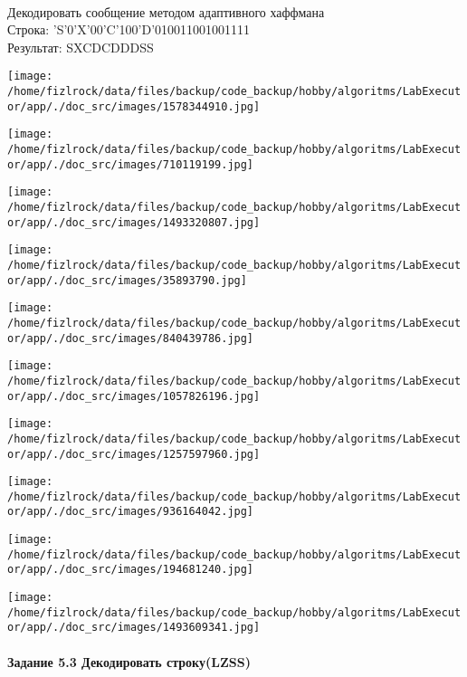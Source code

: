 \documentclass[a4paper, 12pt]{article}
\begin{document}
\\ 

Декодировать сообщение методом адаптивного хаффмана \\
Строка: 
'S'0'X'00'C'100'D'010011001001111\\
Результат: SXCDCDDDSS

\texttt{[image: /home/fizlrock/data/files/backup/code\_backup/hobby/algoritms/LabExecutor/app/./doc\_src/images/1578344910.jpg]}

\texttt{[image: /home/fizlrock/data/files/backup/code\_backup/hobby/algoritms/LabExecutor/app/./doc\_src/images/710119199.jpg]}

\texttt{[image: /home/fizlrock/data/files/backup/code\_backup/hobby/algoritms/LabExecutor/app/./doc\_src/images/1493320807.jpg]}

\texttt{[image: /home/fizlrock/data/files/backup/code\_backup/hobby/algoritms/LabExecutor/app/./doc\_src/images/35893790.jpg]}

\texttt{[image: /home/fizlrock/data/files/backup/code\_backup/hobby/algoritms/LabExecutor/app/./doc\_src/images/840439786.jpg]}

\texttt{[image: /home/fizlrock/data/files/backup/code\_backup/hobby/algoritms/LabExecutor/app/./doc\_src/images/1057826196.jpg]}

\texttt{[image: /home/fizlrock/data/files/backup/code\_backup/hobby/algoritms/LabExecutor/app/./doc\_src/images/1257597960.jpg]}

\texttt{[image: /home/fizlrock/data/files/backup/code\_backup/hobby/algoritms/LabExecutor/app/./doc\_src/images/936164042.jpg]}

\texttt{[image: /home/fizlrock/data/files/backup/code\_backup/hobby/algoritms/LabExecutor/app/./doc\_src/images/194681240.jpg]}

\texttt{[image: /home/fizlrock/data/files/backup/code\_backup/hobby/algoritms/LabExecutor/app/./doc\_src/images/1493609341.jpg]}
\pagebreak
\paragraph{Задание 5.3 Декодировать строку(LZSS)\\}
\end{document}
